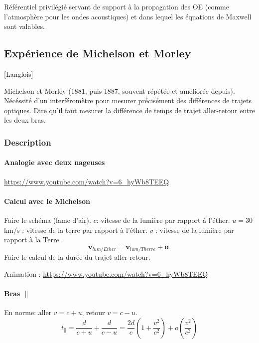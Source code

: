 \documentclass[11pt]{report}
\numberwithin{figure}{section}
\numberwithin{equation}{section}
\numberwithin{table}{section}
\newcommand{\1}{\boldsymbol{1}}
\begin{document}
Référentiel privilégié servant de support à la propagation des OE (comme l'atmosphère pour les ondes acoustiques) et dans lequel les équations de Maxwell sont valables.



\subsection{Expérience de Michelson et Morley}

[Langlois]

Michelson et Morley (1881, puis 1887, souvent répétée et améliorée depuis). Nécéssité d'un interféromètre pour mesurer précisément des différences de trajets optiques. Dire qu'il faut mesurer la différence de temps de trajet aller-retour entre les deux bras.

\subsubsection{Description}

\paragraph{Analogie avec deux nageuses} \url{https://www.youtube.com/watch?v=6_hyWb8TEEQ}

\paragraph{Calcul avec le Michelson}

Faire le schéma (lame d'air). $c$: vitesse de la lumière par rapport à l'éther. $u = 30$ km/s : vitesse de la terre par rapport à l'éther. $v$ : vitesse de la lumière par rapport à la Terre. 
\begin{equation}
\bm v_{lum/Ether} = \bm v_{lum/Therre} + \bm u.
\end{equation}
Faire le calcul de la durée du trajet aller-retour.

Animation : \url{https://www.youtube.com/watch?v=6_hyWb8TEEQ}

\paragraph{Bras $\parallel$}
En norme: aller $v = c + u$, retour $v = c - u$.
\begin{equation}
t_{\parallel} =  \frac{d}{c+u} + \frac{d}{c-u} = \frac{2d}{c} \left(1 + \frac{v^2}{c^2}\right) + o\left(\frac{v^2}{c^2}\right)
\end{equation}
\end{document}
